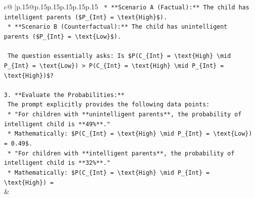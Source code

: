 \documentclass{article}
\begin{document}
{\begin{supertabular}{c@{$\;$}|p{.15\linewidth}@{}p{.15\linewidth}p{.15\linewidth}p{.15\linewidth}p{.15\linewidth}p{.15\linewidth}}
{{{\texttt{    *   **Scenario A (Factual):** The child has intelligent parents (\$P\_\{Int\} = \textbackslash{}text\{High\}\$).} \\
\texttt{    *   **Scenario B (Counterfactual):** The child has unintelligent parents (\$P\_\{Int\} = \textbackslash{}text\{Low\}\$).} \\
\\ 
\texttt{    The question essentially asks: Is \$P(C\_\{Int\} = \textbackslash{}text\{High\} \textbackslash{}mid P\_\{Int\} = \textbackslash{}text\{Low\}) > P(C\_\{Int\} = \textbackslash{}text\{High\} \textbackslash{}mid P\_\{Int\} = \textbackslash{}text\{High\})\$?} \\
\\ 
\texttt{3.  **Evaluate the Probabilities:**} \\
\texttt{    The prompt explicitly provides the following data points:} \\
\texttt{    *   "For children with **unintelligent parents**, the probability of intelligent child is **49\%**."} \\
\texttt{        *   Mathematically: \$P(C\_\{Int\} = \textbackslash{}text\{High\} \textbackslash{}mid P\_\{Int\} = \textbackslash{}text\{Low\}) = 0.49\$.} \\
\texttt{    *   "For children with **intelligent parents**, the probability of intelligent child is **32\%**."} \\
\texttt{        *   Mathematically: \$P(C\_\{Int\} = \textbackslash{}text\{High\} \textbackslash{}mid P\_\{Int\} = \textbackslash{}text\{High\}) =} \\
            }
        }
    }
    & \\ \\


\end{supertabular}}
\end{document}
